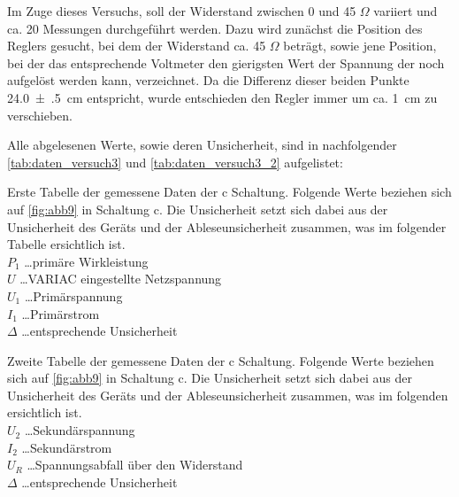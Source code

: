 \documentclass[11pt,ngerman]{scrartcl}
\begin{document}
Im Zuge dieses Versuchs, soll der Widerstand zwischen 0 und 45 $\Omega$
variiert und ca. 20 Messungen durchgeführt werden. Dazu wird zunächst die
Position des Reglers gesucht, bei dem der Widerstand ca. 45 $\Omega$ beträgt,
sowie jene Position, bei der das entsprechende Voltmeter den gierigsten Wert
der Spannung der noch aufgelöst werden kann, verzeichnet. Da die Differenz
dieser beiden Punkte \SI{24.0(5)}{\cm} entspricht,
wurde entschieden den Regler immer um ca. \SI{1}{\cm} zu verschieben.

Alle abgelesenen Werte, sowie deren Unsicherheit, sind in nachfolgender
\autoref{tab:daten_versuch3} und \autoref{tab:daten_versuch3_2} aufgelistet:

\begin{table}[H]
	\caption{
		Erste Tabelle der gemessene Daten der c Schaltung. Folgende Werte beziehen sich auf \autoref{fig:abb9} in Schaltung c. Die Unsicherheit setzt sich dabei aus der Unsicherheit des Geräts und der Ableseunsicherheit zusammen, was im folgender Tabelle ersichtlich ist.\\
		$P_1$ \dots primäre Wirkleistung \\
		$U$ \dots VARIAC eingestellte Netzspannung \\
		$U_1$ \dots  Primärspannung \\
		$I_1$ \dots Primärstrom \\
		$\Delta$ \dots entsprechende Unsicherheit
	}
	\label{tab:daten_versuch3}
	\begin{center}
		
	\end{center}
\end{table}

\begin{table}[H]
	\caption{
		Zweite Tabelle der gemessene Daten der c Schaltung. Folgende Werte beziehen sich auf \autoref{fig:abb9} in Schaltung c. Die Unsicherheit setzt sich dabei aus der Unsicherheit des Geräts und der Ableseunsicherheit zusammen, was im folgenden ersichtlich ist.\\
		$U_2$ \dots Sekundärspannung  \\
		$I_2$ \dots Sekundärstrom \\
		$U_R$ \dots Spannungsabfall über den Widerstand \\
		$\Delta$ \dots entsprechende Unsicherheit
	}
	\label{tab:daten_versuch3_2}
	\begin{center}
		
	\end{center}
\end{table}
\end{document}
